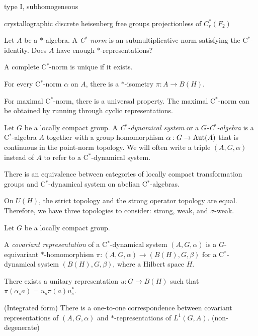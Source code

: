 \documentclass{../../large}
\begin{document}
type I, subhomogeneous


crystallographic
discrete heisenberg
free groups
projectionless of $C_r^*(F_2)$



\begin{prb}
Let $A$ be a $*$-algebra.
A \emph{C$^*$-norm} is an submultiplicative norm satisfying the C$^*$-identity.
Does $A$ have enough $*$-representations?
\begin{parts}
\item A complete C$^*$-norm is unique if it exists.
\item For every C$^*$-norm $\alpha$ on $A$, there is a $*$-isometry $\pi:A\to B(H)$.
\item For maximal C$^*$-norm, there is a universal property. The maximal C$^*$-norm can be obtained by running through cyclic representations.
\end{parts}
\end{prb}




\begin{prb}
Let $G$ be a locally compact group.
A \emph{C$^*$-dynamical system} or a \emph{$G$-C$^*$-algebra} is a C$^*$-algebra $A$ together with a group homomorphism $\alpha:G\to\operatorname{Aut}(A)$ that is continuous in the point-norm topology.
We will often write a triple $(A,G,\alpha)$ instead of $A$ to refer to a C$^*$-dynamical system.
\begin{parts}
\item There is an equivalence between categories of locally compact transformation groups and C$^*$-dynamical system on abelian C$^*$-algebras.
\end{parts}
\end{prb}


On $U(H)$, the strict topology and the strong operator topology are equal.
Therefore, we have three topologies to consider: strong, weak, and $\sigma$-weak.

\begin{prb}
Let $G$ be a locally compact group.

A \emph{covariant representation} of a C$^*$-dynamical system $(A,G,\alpha)$ is a $G$-equivariant $*$-homomorphism $\pi:(A,G,\alpha)\to(B(H),G,\beta)$ for a C$^*$-dynamical system $(B(H),G,\beta)$, where a Hilbert space $H$.
\begin{parts}
\item
There exists a unitary representation $u:G\to B(H)$ such that $\pi(\alpha_sa)=u_s\pi(a)u_s^*$.
\item (Integrated form)
There is a one-to-one correspondence between covariant representations of $(A,G,\alpha)$ and $*$-representations of $L^1(G,A)$. (non-degenerate)
\end{parts}
\end{prb}
\end{document}
